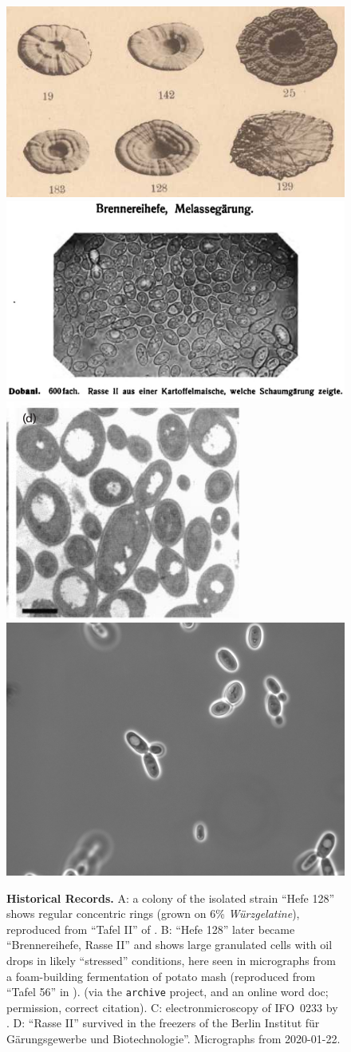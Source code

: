 \documentclass[11pt,a4paper,english]{article}
\newcommand{\ifo}{IFO~0233}
\begin{document}
\begin{figure}[ht] 
  \centering
  \includegraphics[width=.4\linewidth]{figures/lindner1895_TafelII_top.png}
  \includegraphics[width=.49\linewidth]{figures/lindner03_tafel56_top.png}\\
  \includegraphics[width=.35\linewidth]{figures/lloyd02_fig6d.png}
  \includegraphics[width=.45\linewidth]{figures/Aufnahme-24.png}

  \caption{\textbf{Historical Records.}  A: a colony of the isolated
    strain ``Hefe 128'' shows regular concentric rings (grown on 6\%
    \textit{W\"urzgelatine}), reproduced from ``Tafel II'' of
    \citet{Lindner1895}.  B: ``Hefe 128'' later became
    ``Brennereihefe, Rasse II'' and shows large granulated cells with
    oil drops in likely ``stressed'' conditions, here seen in
    micrographs from a foam-building fermentation of potato mash
    (reproduced from ``Tafel 56'' in \citet{Lindner1903}). (via the
    \texttt{archive} project, and an online word doc; permission,
    correct citation). C: electronmicroscopy of \ifo{} by
    \citet{Lloyd2002b}.  D: ``Rasse II'' survived in the freezers of
    the Berlin Institut f\"ur G\"arungsgewerbe und
    Biotechnologie''. Micrographs from 2020-01-22.}
  \label{fig:hefe128}
\end{figure}
\end{document}
